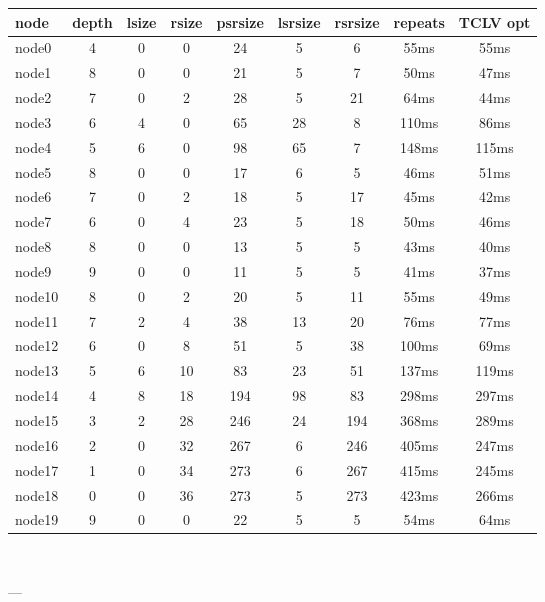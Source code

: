 

\begin{tabular}{|l|c|c|c|c|c|c|c|c|}
\hline node & depth & lsize & rsize & psrsize & lsrsize & rsrsize   & repeats & TCLV opt\\
    \hline node0 & 4 & 0 & 0 & 24 & 5 & 6 & 55ms & 55ms\\
    \hline node1 & 8 & 0 & 0 & 21 & 5 & 7 & 50ms & 47ms\\
    \hline node2 & 7 & 0 & 2 & 28 & 5 & 21 & 64ms & 44ms\\
    \hline node3 & 6 & 4 & 0 & 65 & 28 & 8 & 110ms & 86ms\\
    \hline node4 & 5 & 6 & 0 & 98 & 65 & 7 & 148ms & 115ms\\
    \hline node5 & 8 & 0 & 0 & 17 & 6 & 5 & 46ms & 51ms\\
    \hline node6 & 7 & 0 & 2 & 18 & 5 & 17 & 45ms & 42ms\\
    \hline node7 & 6 & 0 & 4 & 23 & 5 & 18 & 50ms & 46ms\\
    \hline node8 & 8 & 0 & 0 & 13 & 5 & 5 & 43ms & 40ms\\
    \hline node9 & 9 & 0 & 0 & 11 & 5 & 5 & 41ms & 37ms\\
    \hline node10 & 8 & 0 & 2 & 20 & 5 & 11 & 55ms & 49ms\\
    \hline node11 & 7 & 2 & 4 & 38 & 13 & 20 & 76ms & 77ms\\
    \hline node12 & 6 & 0 & 8 & 51 & 5 & 38 & 100ms & 69ms\\
    \hline node13 & 5 & 6 & 10 & 83 & 23 & 51 & 137ms & 119ms\\
    \hline node14 & 4 & 8 & 18 & 194 & 98 & 83 & 298ms & 297ms\\
    \hline node15 & 3 & 2 & 28 & 246 & 24 & 194 & 368ms & 289ms\\
    \hline node16 & 2 & 0 & 32 & 267 & 6 & 246 & 405ms & 247ms\\
    \hline node17 & 1 & 0 & 34 & 273 & 6 & 267 & 415ms & 245ms\\
    \hline node18 & 0 & 0 & 36 & 273 & 5 & 273 & 423ms & 266ms\\
    \hline node19 & 9 & 0 & 0 & 22 & 5 & 5 & 54ms & 64ms\\

\hline
\end{tabular} \

---


